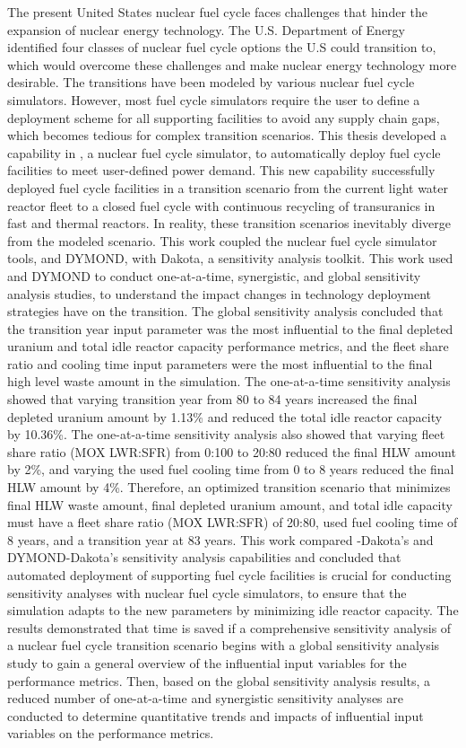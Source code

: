 The present United States nuclear fuel cycle faces challenges that hinder 
the expansion of nuclear energy technology. 
The U.S. Department of Energy identified four classes of nuclear fuel cycle 
options the U.S could transition to, which would overcome these challenges 
and make nuclear energy technology more desirable. 
The transitions have been modeled by various nuclear fuel cycle simulators. 
However, most fuel cycle simulators require the user to define a deployment 
scheme for all supporting facilities to avoid any supply chain gaps, which becomes 
tedious for complex transition scenarios.
This thesis developed a capability in \Cyclus, a nuclear fuel cycle simulator, 
to automatically deploy fuel cycle 
facilities to meet user-defined power demand. 
This new capability successfully deployed fuel cycle facilities
in a transition scenario from the current 
light water reactor fleet to a closed fuel cycle with continuous recycling of transuranics in fast and 
thermal reactors.
In reality, these transition scenarios inevitably diverge from the 
modeled scenario. 
This work coupled the nuclear fuel cycle simulator tools, \Cyclus and DYMOND, 
with Dakota, a sensitivity analysis toolkit. 
This work used \Cyclus and DYMOND to conduct one-at-a-time, synergistic, 
and global sensitivity analysis studies, to understand the impact changes 
in technology deployment strategies have on the transition.
The global sensitivity analysis concluded that 
the transition year input parameter was the most influential
to the final depleted uranium and total idle reactor capacity 
performance metrics, and  
the fleet share ratio and cooling time input parameters 
were the most influential to the final high level waste amount in the 
simulation. 
The one-at-a-time sensitivity analysis showed that varying transition 
year from 80 to 84 years increased the final depleted uranium amount by 
1.13\% and reduced the total idle reactor capacity by 10.36\%. 
The one-at-a-time sensitivity analysis also showed that varying 
fleet share ratio (MOX LWR:SFR) from 0:100 to 20:80 reduced the 
final HLW amount by 2\%, and varying the used fuel cooling time from 0 to 
8 years reduced the final HLW amount by 4\%. 
Therefore, an optimized transition scenario that minimizes final 
HLW waste amount, final depleted uranium amount, and total idle capacity 
must have a fleet share ratio (MOX LWR:SFR) of 20:80, used fuel cooling time 
of 8 years, and a transition year at 83 years. 
This work compared \Cyclus-Dakota's and DYMOND-Dakota's sensitivity 
analysis capabilities 
and concluded that automated deployment of supporting fuel cycle 
facilities is crucial for conducting sensitivity analyses 
with nuclear fuel cycle simulators, to ensure that the simulation 
adapts to the new parameters by minimizing idle reactor capacity. 
The results demonstrated that time is saved if a comprehensive 
sensitivity analysis of a nuclear fuel cycle transition scenario 
begins with a global sensitivity analysis study to gain a general 
overview of the influential input variables for the performance metrics. 
Then, based on the global sensitivity analysis results, a reduced number of 
one-at-a-time and synergistic sensitivity analyses are conducted 
to determine quantitative trends and impacts of influential 
input variables on the performance metrics.